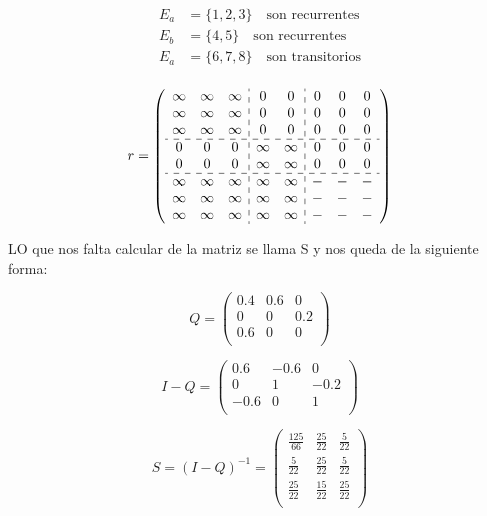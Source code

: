 \begin{align*}
 E_{a} & = \{1, 2, 3\} \quad \text{son recurrentes} \\
 E_{b} & = \{4, 5\} \quad \text{son recurrentes} \\
 E_{a} & = \{6, 7, 8\} \quad \text{son transitorios} \\
\end{align*}

\[
r =
\left(
\begin{array}{ccc:cc:ccc}
\infty & \infty & \infty & 0 & 0 & 0 & 0 & 0 \\
\infty & \infty & \infty & 0 & 0 & 0 & 0 & 0 \\
\infty & \infty & \infty & 0 & 0 & 0 & 0 & 0 \\
\hdashline 
0 & 0 & 0 & \infty & \infty & 0 & 0 & 0 \\
0 & 0 & 0 & \infty & \infty & 0 & 0 & 0 \\
\hdashline 
\infty & \infty & \infty & \infty & \infty & - & - & - \\
\infty & \infty & \infty & \infty & \infty & - & - & - \\
\infty & \infty & \infty & \infty & \infty & - & - & - \\
\end{array}
\right)
\]

LO que nos falta calcular de la matriz se llama S y nos queda de la siguiente forma:

\[
Q =
\left(
\begin{array}{ccc}
0.4 & 0.6 & 0 \\
0 & 0 & 0.2 \\
0.6 & 0 & 0 \\
\end{array}
\right)
\]

\[
I-Q =
\left(
\begin{array}{ccc}
0.6 & -0.6 & 0 \\
0 & 1 & -0.2 \\
-0.6 & 0 & 1 \\
\end{array}
\right)
\]

\[
S= (I-Q)^{-1} =
\left(
\begin{array}{ccc}
\frac{125}{66} & \frac{25}{22} & \frac{5}{22} \\
\frac{5}{22} & \frac{25}{22} & \frac{5}{22} \\
\frac{25}{22} & \frac{15}{22} & \frac{25}{22} \\
\end{array}
\right)
\]


